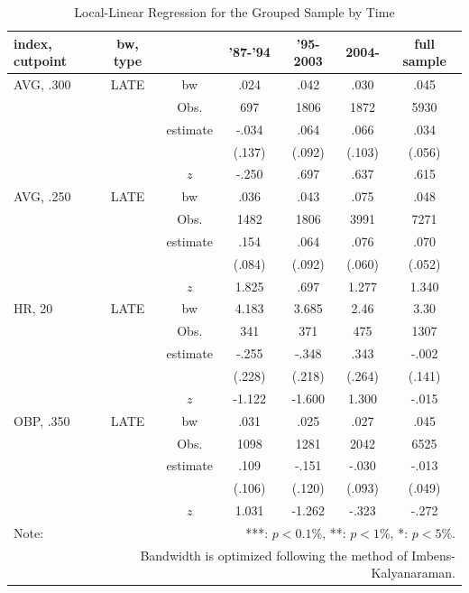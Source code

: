 \documentclass[dvipdfmx,12pt]{beamer}
\begin{document}
\begin{frame}
  \begin{table}
    \centering
    \caption{Local-Linear Regression for the Grouped Sample by Time}
    \label{RDD_Era}
    \tiny
    \begin{tabular}{lcccccc} \hline
      index, cutpoint & bw, type &  &'87-'94 & '95-2003 & 2004- &full sample \\ \hline \hline
      AVG, .300 & LATE & bw & .024 & .042 & .030 & .045 \\
      &  & Obs. & 697 & 1806 & 1872 & 5930 \\
      &  & estimate & -.034 & .064 & .066 & .034 \\
      &  & & (.137) & (.092) & (.103) & (.056) \\
      & & $z$ & -.250 & .697 & .637 & .615 \\ \hline
      AVG, .250 & LATE & bw & .036 & .043 &.075 & .048 \\
      &  & Obs. & 1482 & 1806 & 3991 & 7271 \\
      &  & estimate & .154 & .064 & .076 & .070 \\
      &  & & (.084) & (.092) & (.060) & (.052) \\
      & & $z$ & 1.825 & .697 & 1.277 & 1.340 \\ \hline
      HR, 20 & LATE & bw & 4.183 & 3.685 & 2.46 & 3.30 \\
      &  & Obs. & 341 & 371 & 475 & 1307 \\
      &  & estimate & -.255 & -.348 & .343 & -.002 \\
      &  & & (.228) & (.218) & (.264) & (.141) \\
      & & $z$ & -1.122 & -1.600 & 1.300 & -.015 \\ \hline
      OBP, .350 & LATE & bw & .031 & .025 & .027 & .045 \\
      &  & Obs. & 1098 & 1281 & 2042 & 6525 \\
      &  & estimate & .109 & -.151 & -.030 & -.013 \\
      &  & & (.106) & (.120) & (.093) & (.049) \\
      & & $z$ & 1.031 & -1.262 & -.323 & -.272 \\ \hline
      Note: & \multicolumn{6}{r}{***: $p<0.1\%$, **: $p<1\%$, *: $p<5\%$.} \\
      & \multicolumn{6}{r}{Bandwidth is optimized following the method of Imbens-Kalyanaraman.}
    \end{tabular}
  \end{table}
\end{frame}
\end{document}
